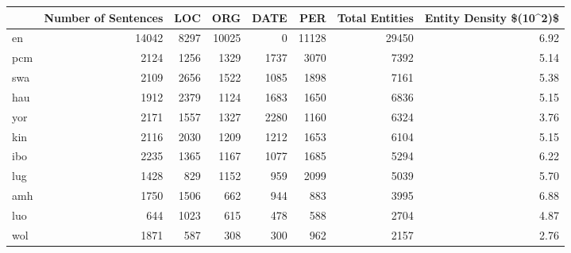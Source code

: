 \begin{tabular}{lrrrrrrr}
\toprule
{} &  Number of Sentences &   LOC &    ORG &  DATE &    PER &  Total Entities &  Entity Density \$(10\textasciicircum 2)\$ \\
\midrule
en  &                14042 &  8297 &  10025 &     0 &  11128 &           29450 &                     6.92 \\
pcm &                 2124 &  1256 &   1329 &  1737 &   3070 &            7392 &                     5.14 \\
swa &                 2109 &  2656 &   1522 &  1085 &   1898 &            7161 &                     5.38 \\
hau &                 1912 &  2379 &   1124 &  1683 &   1650 &            6836 &                     5.15 \\
yor &                 2171 &  1557 &   1327 &  2280 &   1160 &            6324 &                     3.76 \\
kin &                 2116 &  2030 &   1209 &  1212 &   1653 &            6104 &                     5.15 \\
ibo &                 2235 &  1365 &   1167 &  1077 &   1685 &            5294 &                     6.22 \\
lug &                 1428 &   829 &   1152 &   959 &   2099 &            5039 &                     5.70 \\
amh &                 1750 &  1506 &    662 &   944 &    883 &            3995 &                     6.88 \\
luo &                  644 &  1023 &    615 &   478 &    588 &            2704 &                     4.87 \\
wol &                 1871 &   587 &    308 &   300 &    962 &            2157 &                     2.76 \\
\bottomrule
\end{tabular}
